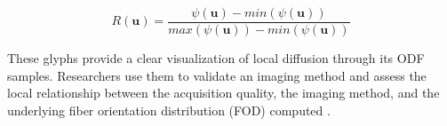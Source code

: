 \documentclass[twoside,twocolumn,10pt]{article}
\begin{document}


\begin{equation}
\label{eq::normglifo}
    R(\bm{u}) = \frac{\psi(\bm{u}) - min(\psi(\bm{u}))}{max(\psi(\bm{u})) - min(\psi(\bm{u}))}
\end{equation}


These glyphs provide a clear visualization of local diffusion through its ODF samples. Researchers use them to validate an imaging method \cite{descoteaux2007_QBI,  TuchQBall2004,tournier2007,Tournier2004DirectEO, tuch2002,  yeh2010} and assess the local relationship between the acquisition quality, the imaging method, and the underlying fiber orientation distribution (FOD) computed \cite{cho2008, daducci2014,descoteaux2007,  vega2009}. %
\end{document}
